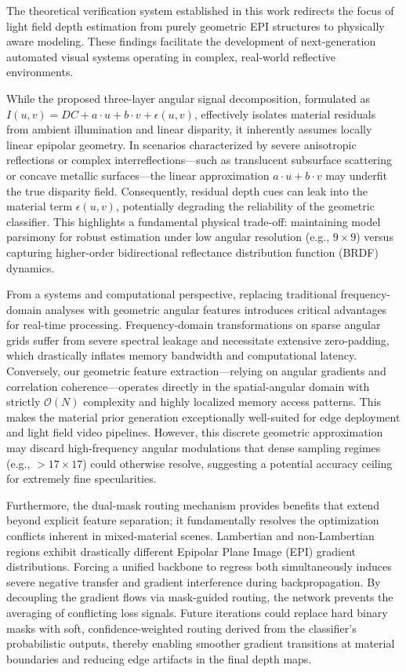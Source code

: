 \documentclass[lettersize,journal]{IEEEtran}
\begin{document}
The theoretical verification system established in this work redirects the focus of light field depth estimation from purely geometric EPI structures to physically aware modeling. These findings facilitate the development of next-generation automated visual systems operating in complex, real-world reflective environments.

While the proposed three-layer angular signal decomposition, formulated as $I(u,v) = DC + a\cdot u + b\cdot v + \epsilon(u,v)$, effectively isolates material residuals from ambient illumination and linear disparity, it inherently assumes locally linear epipolar geometry. In scenarios characterized by severe anisotropic reflections or complex interreflections---such as translucent subsurface scattering or concave metallic surfaces---the linear approximation $a\cdot u + b\cdot v$ may underfit the true disparity field. Consequently, residual depth cues can leak into the material term $\epsilon(u,v)$, potentially degrading the reliability of the geometric classifier. This highlights a fundamental physical trade-off: maintaining model parsimony for robust estimation under low angular resolution (e.g., $9 \times 9$) versus capturing higher-order bidirectional reflectance distribution function (BRDF) dynamics.

From a systems and computational perspective, replacing traditional frequency-domain analyses with geometric angular features introduces critical advantages for real-time processing. Frequency-domain transformations on sparse angular grids suffer from severe spectral leakage and necessitate extensive zero-padding, which drastically inflates memory bandwidth and computational latency. Conversely, our geometric feature extraction---relying on angular gradients and correlation coherence---operates directly in the spatial-angular domain with strictly $\mathcal{O}(N)$ complexity and highly localized memory access patterns. This makes the material prior generation exceptionally well-suited for edge deployment and light field video pipelines. However, this discrete geometric approximation may discard high-frequency angular modulations that dense sampling regimes (e.g., $>17 \times 17$) could otherwise resolve, suggesting a potential accuracy ceiling for extremely fine specularities.

Furthermore, the dual-mask routing mechanism provides benefits that extend beyond explicit feature separation; it fundamentally resolves the optimization conflicts inherent in mixed-material scenes. Lambertian and non-Lambertian regions exhibit drastically different Epipolar Plane Image (EPI) gradient distributions. Forcing a unified backbone to regress both simultaneously induces severe negative transfer and gradient interference during backpropagation. By decoupling the gradient flows via mask-guided routing, the network prevents the averaging of conflicting loss signals. Future iterations could replace hard binary masks with soft, confidence-weighted routing derived from the classifier's probabilistic outputs, thereby enabling smoother gradient transitions at material boundaries and reducing edge artifacts in the final depth maps.
\end{document}
